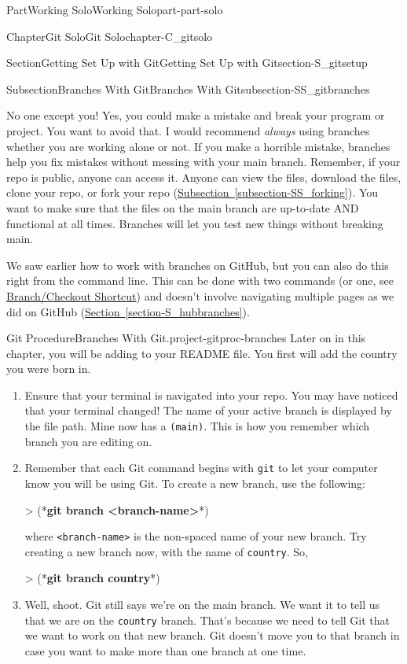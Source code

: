 \documentclass[oneside,10pt,]{book}
\newcommand{\xreffont}{\relax}
\newcommand{\mono}[1]{\texttt{#1}}
\newcommand{\consoleinput}[1]{\textbf{#1}}
\begin{document}
\begin{partptx}{Part}{Working Solo}{}{Working Solo}{}{}{part-part-solo}
\begin{chapterptx}{Chapter}{Git Solo}{}{Git Solo}{}{}{chapter-C_gitsolo}
\begin{sectionptx}{Section}{Getting Set Up with Git}{}{Getting Set Up with Git}{}{}{section-S_gitsetup}
\begin{subsectionptx}{Subsection}{Branches With Git}{}{Branches With Git}{}{}{subsection-SS_gitbranches}
\par
No one except you! Yes, you could make a mistake and break your program or project. You want to avoid that. I would recommend \emph{always} using branches whether you are working alone or not. If you make a horrible mistake, branches help you fix mistakes without messing with your main branch. Remember, if your repo is public, anyone can access it. Anyone can view the files, download the files, clone your repo, or fork your repo (\hyperref[subsection-SS_forking]{Subsection~{\xreffont\ref{subsection-SS_forking}}}). You want to make sure that the files on the main branch are up-to-date AND functional at all times. Branches will let you test new things without breaking main.%
\par
We saw earlier how to work with branches on GitHub, but you can also do this right from the command line. This can be done with two commands (or one, see \hyperlink{paragraphs-branch-shortcut}{Branch\slash{}Checkout Shortcut}) and doesn't involve navigating multiple pages as we did on GitHub (\hyperref[section-S_hubbranches]{Section~{\xreffont\ref{section-S_hubbranches}}}).%
\begin{project}{Git Procedure}{Branches With Git.}{project-gitproc-branches}%
%
%
%
Later on in this chapter, you will be adding to your README file. You first will add the country you were born in.%
\begin{enumerate}[font=\bfseries,label=(\alph*),ref=\alph*]%
\item{}Ensure that your terminal is navigated into your repo. You may have noticed that your terminal changed! The name of your active branch is displayed by the file path. Mine now has a \mono{(main)}. This is how you remember which branch you are editing on.%
\item{}Remember that each Git command begins with \mono{git} to let your computer know you will be using Git. To create a new branch, use the following:%
\begin{console}{0}{1}{0}
> (*\consoleinput{git branch <branch-name>}*)
\end{console}
where \mono{<branch-name>} is the non-spaced name of your new branch. Try creating a new branch now, with the name of \mono{country}. So,%
\begin{console}{0}{1}{0}
> (*\consoleinput{git branch country}*)
\end{console}
\item{}Well, shoot. Git still says we're on the main branch. We want it to tell us that we are on the \mono{country} branch. That's because we need to tell Git that we want to work on that new branch. Git doesn't move you to that branch in case you want to make more than one branch at one time.%

\end{enumerate}
\end{project}
\end{subsectionptx}
\end{sectionptx}
\end{chapterptx}
\end{partptx}
\end{document}
